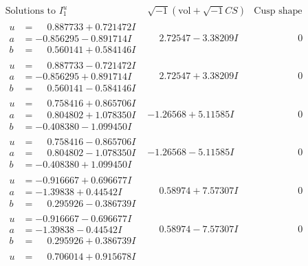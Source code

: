 \documentclass[1p]{elsarticle_modified}
\theoremstyle{definition}
\newcommand{\I}{\sqrt{-1}}
\begin{document}
$$\begin{array}{c|c|c}
\text{Solutions to }I^u_{1}& \I (\text{vol} + \sqrt{-1}CS) & \text{Cusp shape}\\
 \hline 
\begin{aligned}
u &= \phantom{-}0.887733 + 0.721472 I \\
a &= -0.856295 - 0.891714 I \\
b &= \phantom{-}0.560141 + 0.584146 I\end{aligned}
 & \phantom{-}2.72547 - 3.38209 I & \phantom{-0.000000 } 0 \\ \hline\begin{aligned}
u &= \phantom{-}0.887733 - 0.721472 I \\
a &= -0.856295 + 0.891714 I \\
b &= \phantom{-}0.560141 - 0.584146 I\end{aligned}
 & \phantom{-}2.72547 + 3.38209 I & \phantom{-0.000000 } 0 \\ \hline\begin{aligned}
u &= \phantom{-}0.758416 + 0.865706 I \\
a &= \phantom{-}0.804802 + 1.078350 I \\
b &= -0.408380 - 1.099450 I\end{aligned}
 & -1.26568 + 5.11585 I & \phantom{-0.000000 } 0 \\ \hline\begin{aligned}
u &= \phantom{-}0.758416 - 0.865706 I \\
a &= \phantom{-}0.804802 - 1.078350 I \\
b &= -0.408380 + 1.099450 I\end{aligned}
 & -1.26568 - 5.11585 I & \phantom{-0.000000 } 0 \\ \hline\begin{aligned}
u &= -0.916667 + 0.696677 I \\
a &= -1.39838 + 0.44542 I \\
b &= \phantom{-}0.295926 - 0.386739 I\end{aligned}
 & \phantom{-}0.58974 + 7.57307 I & \phantom{-0.000000 } 0 \\ \hline\begin{aligned}
u &= -0.916667 - 0.696677 I \\
a &= -1.39838 - 0.44542 I \\
b &= \phantom{-}0.295926 + 0.386739 I\end{aligned}
 & \phantom{-}0.58974 - 7.57307 I & \phantom{-0.000000 } 0 \\ \hline\begin{aligned}
u &= \phantom{-}0.706014 + 0.915678 I \\

\end{aligned}
\end{array}$$
\end{document}
